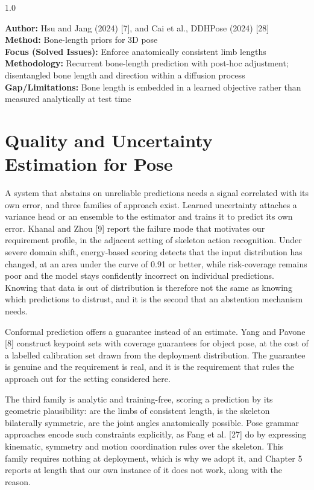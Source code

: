 \documentclass[12pt,a4paper]{report}
\begin{document}
\begin{spacing}{1.0}
\vspace{0.18cm}

\noindent \textbf{Author:} Hsu and Jang (2024) [7], and Cai et al., DDHPose (2024) [28] \\
\textbf{Method:} Bone-length priors for 3D pose \\
\textbf{Focus (Solved Issues):} Enforce anatomically consistent limb lengths \\
\textbf{Methodology:} Recurrent bone-length prediction with post-hoc adjustment; disentangled bone length and direction within a diffusion process \\
\textbf{Gap/Limitations:} Bone length is embedded in a learned objective rather than measured analytically at test time
\end{spacing}

\section{Quality and Uncertainty Estimation for Pose}

A system that abstains on unreliable predictions needs a signal correlated with its own error, and three families of approach exist. Learned uncertainty attaches a variance head or an ensemble to the estimator and trains it to predict its own error. Khanal and Zhou [9] report the failure mode that motivates our requirement profile, in the adjacent setting of skeleton action recognition. Under severe domain shift, energy-based scoring detects that the input distribution has changed, at an area under the curve of 0.91 or better, while risk-coverage remains poor and the model stays confidently incorrect on individual predictions. Knowing that data is out of distribution is therefore not the same as knowing which predictions to distrust, and it is the second that an abstention mechanism needs.

Conformal prediction offers a guarantee instead of an estimate. Yang and Pavone [8] construct keypoint sets with coverage guarantees for object pose, at the cost of a labelled calibration set drawn from the deployment distribution. The guarantee is genuine and the requirement is real, and it is the requirement that rules the approach out for the setting considered here.

The third family is analytic and training-free, scoring a prediction by its geometric plausibility: are the limbs of consistent length, is the skeleton bilaterally symmetric, are the joint angles anatomically possible. Pose grammar approaches encode such constraints explicitly, as Fang et al. [27] do by expressing kinematic, symmetry and motion coordination rules over the skeleton. This family requires nothing at deployment, which is why we adopt it, and Chapter 5 reports at length that our own instance of it does not work, along with the reason.
\end{document}
